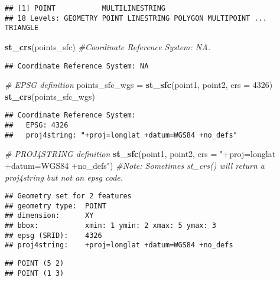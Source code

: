 \documentclass[]{article}
\newenvironment{Shaded}{\begin{snugshade}}{\end{snugshade}}
\newcommand{\CommentTok}[1]{\textcolor[rgb]{0.56,0.35,0.01}{\textit{#1}}}
\newcommand{\DataTypeTok}[1]{\textcolor[rgb]{0.13,0.29,0.53}{#1}}
\newcommand{\DecValTok}[1]{\textcolor[rgb]{0.00,0.00,0.81}{#1}}
\newcommand{\KeywordTok}[1]{\textcolor[rgb]{0.13,0.29,0.53}{\textbf{#1}}}
\newcommand{\NormalTok}[1]{#1}
\newcommand{\StringTok}[1]{\textcolor[rgb]{0.31,0.60,0.02}{#1}}
\begin{document}
\begin{verbatim}
## [1] POINT           MULTILINESTRING
## 18 Levels: GEOMETRY POINT LINESTRING POLYGON MULTIPOINT ... TRIANGLE
\end{verbatim}

\begin{Shaded}
\begin{Highlighting}[]
\KeywordTok{st_crs}\NormalTok{(points_sfc) }\CommentTok{#Coordinate Reference System: NA.}
\end{Highlighting}
\end{Shaded}

\begin{verbatim}
## Coordinate Reference System: NA
\end{verbatim}

\begin{Shaded}
\begin{Highlighting}[]
\CommentTok{# EPSG definition}
\NormalTok{points_sfc_wgs =}\StringTok{ }\KeywordTok{st_sfc}\NormalTok{(point1, point2, }\DataTypeTok{crs =} \DecValTok{4326}\NormalTok{)}
\KeywordTok{st_crs}\NormalTok{(points_sfc_wgs)}
\end{Highlighting}
\end{Shaded}

\begin{verbatim}
## Coordinate Reference System:
##   EPSG: 4326 
##   proj4string: "+proj=longlat +datum=WGS84 +no_defs"
\end{verbatim}

\begin{Shaded}
\begin{Highlighting}[]
\CommentTok{# PROJ4STRING definition}
\KeywordTok{st_sfc}\NormalTok{(point1, point2, }\DataTypeTok{crs =} \StringTok{"+proj=longlat +datum=WGS84 +no_defs"}\NormalTok{) }\CommentTok{#Note: Sometimes st_crs() will return a proj4string but not an epsg code.}
\end{Highlighting}
\end{Shaded}

\begin{verbatim}
## Geometry set for 2 features 
## geometry type:  POINT
## dimension:      XY
## bbox:           xmin: 1 ymin: 2 xmax: 5 ymax: 3
## epsg (SRID):    4326
## proj4string:    +proj=longlat +datum=WGS84 +no_defs
\end{verbatim}

\begin{verbatim}
## POINT (5 2)
## POINT (1 3)
\end{verbatim}
\end{document}

